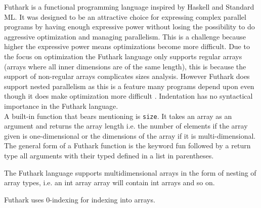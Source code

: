 \documentclass[11pt]{article}
\begin{document}
Futhark is a functional programming language inspired by Haskell and Standard ML.
It was designed to be an attractive choice for expressing complex parallel programs by having enough expressive power without
losing the possibility to do aggressive optimization and managing parallelism.
This is a challenge because higher the expressive power means optimizations become more difficult. 
Due to the focus on optimization the Futhark language only supports regular arrays
(arrays where all inner dimensions are of the same length),
this is because the support of non-regular arrays  complicates sizes analysis.
However Futhark does support nested parallelism as this is a feature many programs 
depend upon even though it does make optimization more difficult \cite{TroelsHenriksen}.
Indentation has no syntactical importance in the Futhark language. \\










A built-in function that bears mentioning is {\tt size}.
It takes an array as an argument and returns the array length i.e.
the number of elements if the array given is one-dimensional or the dimensions of the array if it is multi-dimensional. \\

The general form of a Futhark function is the keyword fun followed by a return type all arguments 
with their typed defined in a list in parentheses.



The Futhark language supports multidimensional arrays in the form of nesting of array types,
i.e. an int array array will contain int arrays and so on.


Futhark uses 0-indexing for indexing into arrays.\\ %

\end{document}
